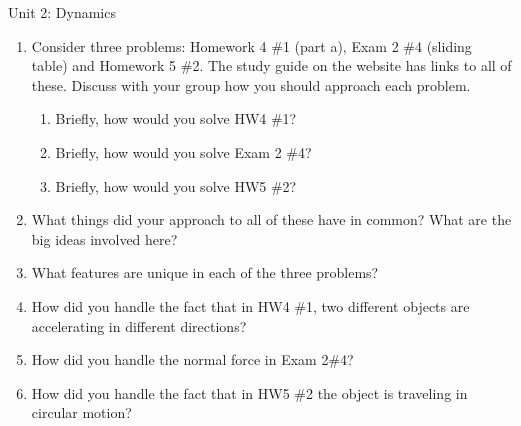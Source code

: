 \documentclass[12pt]{article}
\begin{document}
\begin{center}
	\Large Unit 2: Dynamics
\end{center}
\begin{enumerate}
	\item Consider three problems: Homework 4 \#1 (part a), Exam 2 \#4 (sliding table) and Homework 5 \#2. The study guide on the website has links to all of these. Discuss with your group how you should approach each problem.
	
	\begin{enumerate}
		\item Briefly, how would you solve HW4 \#1?
		\vspace{1in}
		\item Briefly, how would you solve Exam 2 \#4?
		\vspace{1in}
		\item Briefly, how would you solve HW5 \#2?
		\vspace{1in}
	\end{enumerate}
	\item What things did your approach to all of these have in common? What are the big ideas involved here?
	
	\newpage
	
	\item What features are unique in each of the three problems?
	
	\vspace{3in}
	
	\item How did you handle the fact that in HW4 \#1, two different objects are accelerating in different directions?
	
	\vspace{1.5in}
	
	\item How did you handle the normal force in Exam 2\#4?
	
	\vspace{1.5in}
	
	\item How did you handle the fact that in HW5 \#2 the object is traveling in circular motion?
\end{enumerate}

\newpage
\end{document}
